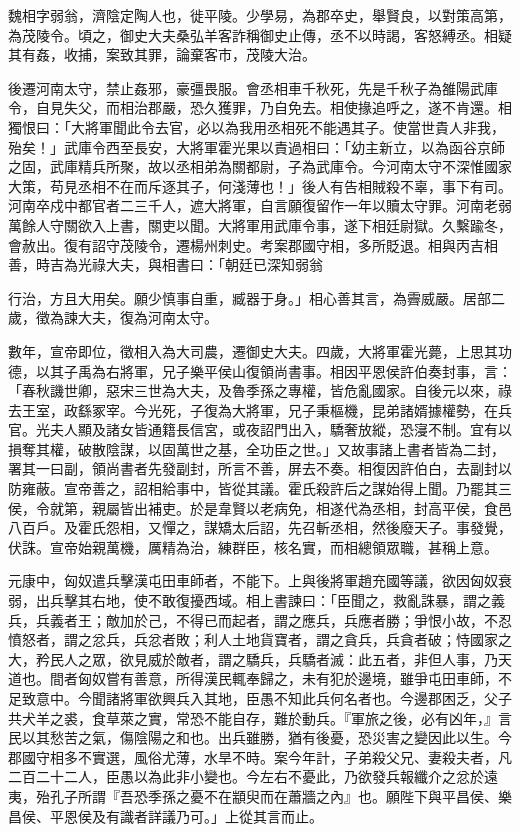 
\begin{pinyinscope}
魏相字弱翁，濟陰定陶人也，徙平陵。少學易，為郡卒史，舉賢良，以對策高第，為茂陵令。頃之，御史大夫桑弘羊客詐稱御史止傳，丞不以時謁，客怒縛丞。相疑其有姦，收捕，案致其罪，論棄客市，茂陵大治。

後遷河南太守，禁止姦邪，豪彊畏服。會丞相車千秋死，先是千秋子為雒陽武庫令，自見失父，而相治郡嚴，恐久獲罪，乃自免去。相使掾追呼之，遂不肯還。相獨恨曰：「大將軍聞此令去官，必以為我用丞相死不能遇其子。使當世貴人非我，殆矣！」武庫令西至長安，大將軍霍光果以責過相曰：「幼主新立，以為函谷京師之固，武庫精兵所聚，故以丞相弟為關都尉，子為武庫令。今河南太守不深惟國家大策，苟見丞相不在而斥逐其子，何淺薄也！」後人有告相賊殺不辜，事下有司。河南卒戍中都官者二三千人，遮大將軍，自言願復留作一年以贖太守罪。河南老弱萬餘人守關欲入上書，關吏以聞。大將軍用武庫令事，遂下相廷尉獄。久繫踰冬，會赦出。復有詔守茂陵令，遷楊州刺史。考案郡國守相，多所貶退。相與丙吉相善，時吉為光祿大夫，與相書曰：「朝廷已深知弱翁

行治，方且大用矣。願少慎事自重，臧器于身。」相心善其言，為霽威嚴。居部二歲，徵為諫大夫，復為河南太守。

數年，宣帝即位，徵相入為大司農，遷御史大夫。四歲，大將軍霍光薨，上思其功德，以其子禹為右將軍，兄子樂平侯山復領尚書事。相因平恩侯許伯奏封事，言：「春秋譏世卿，惡宋三世為大夫，及魯季孫之專權，皆危亂國家。自後元以來，祿去王室，政繇冢宰。今光死，子復為大將軍，兄子秉樞機，昆弟諸婿據權勢，在兵官。光夫人顯及諸女皆通籍長信宮，或夜詔門出入，驕奢放縱，恐寖不制。宜有以損奪其權，破散陰謀，以固萬世之基，全功臣之世。」又故事諸上書者皆為二封，署其一曰副，領尚書者先發副封，所言不善，屏去不奏。相復因許伯白，去副封以防雍蔽。宣帝善之，詔相給事中，皆從其議。霍氏殺許后之謀始得上聞。乃罷其三侯，令就第，親屬皆出補吏。於是韋賢以老病免，相遂代為丞相，封高平侯，食邑八百戶。及霍氏怨相，又憚之，謀矯太后詔，先召斬丞相，然後廢天子。事發覺，伏誅。宣帝始親萬機，厲精為治，練群臣，核名實，而相總領眾職，甚稱上意。

元康中，匈奴遣兵擊漢屯田車師者，不能下。上與後將軍趙充國等議，欲因匈奴衰弱，出兵擊其右地，使不敢復擾西域。相上書諫曰：「臣聞之，救亂誅暴，謂之義兵，兵義者王；敵加於己，不得已而起者，謂之應兵，兵應者勝；爭恨小故，不忍憤怒者，謂之忿兵，兵忿者敗；利人土地貨寶者，謂之貪兵，兵貪者破；恃國家之大，矜民人之眾，欲見威於敵者，謂之驕兵，兵驕者滅：此五者，非但人事，乃天道也。間者匈奴嘗有善意，所得漢民輒奉歸之，未有犯於邊境，雖爭屯田車師，不足致意中。今聞諸將軍欲興兵入其地，臣愚不知此兵何名者也。今邊郡困乏，父子共犬羊之裘，食草萊之實，常恐不能自存，難於動兵。『軍旅之後，必有凶年，』言民以其愁苦之氣，傷陰陽之和也。出兵雖勝，猶有後憂，恐災害之變因此以生。今郡國守相多不實選，風俗尤薄，水旱不時。案今年計，子弟殺父兄、妻殺夫者，凡二百二十二人，臣愚以為此非小變也。今左右不憂此，乃欲發兵報纖介之忿於遠夷，殆孔子所謂『吾恐季孫之憂不在顓臾而在蕭牆之內』也。願陛下與平昌侯、樂昌侯、平恩侯及有識者詳議乃可。」上從其言而止。


\end{pinyinscope}
